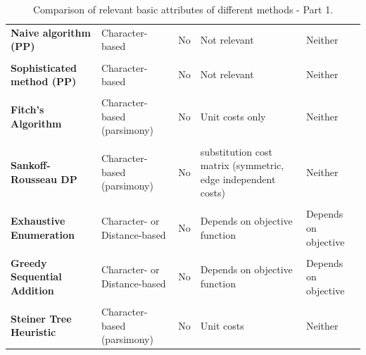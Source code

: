\begin{table}[H]
\begin{tabular}{p{3.5cm}p{3cm}p{2cm}p{3cm}p{3cm}}
\textbf{Naive algorithm (PP)} & Character-based & No & Not relevant & Neither \\ \\
\textbf{Sophisticated method (PP)} & Character-based & No & Not relevant & Neither \\ \\
\textbf{Fitch's Algorithm} & Character-based (parsimony) & No & Unit costs only & Neither \\ \\
\textbf{Sankoff-Rousseau DP} & Character-based (parsimony) & No & substitution cost matrix (symmetric, edge independent costs) & Neither \\ \\
\textbf{Exhaustive Enumeration} & Character- or Distance-based & No & Depends on objective function & Depends on objective \\ \\
\textbf{Greedy Sequential Addition} & Character- or Distance-based  & No & Depends on objective function & Depends on objective \\ \\
\textbf{Steiner Tree Heuristic} & Character-based (parsimony) & No & Unit costs & Neither 
\end{tabular}
 \caption{Comparison of relevant basic attributes of different methods - Part 1.}
\end{table}
